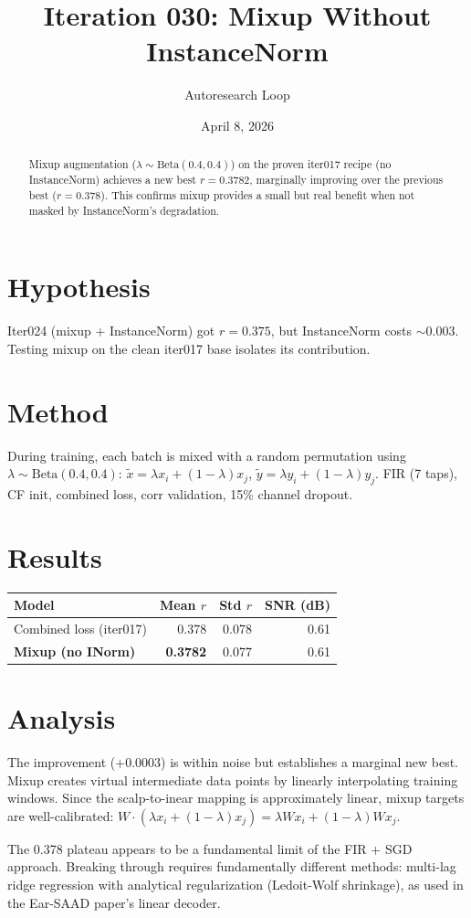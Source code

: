 \documentclass[11pt,a4paper]{article}
\title{Iteration 030: Mixup Without InstanceNorm}
\author{Autoresearch Loop}
\date{April 8, 2026}
\begin{document}
\maketitle

\begin{abstract}
Mixup augmentation ($\lambda \sim \text{Beta}(0.4, 0.4)$) on the proven
iter017 recipe (no InstanceNorm) achieves a new best $r=0.3782$, marginally
improving over the previous best ($r=0.378$). This confirms mixup provides
a small but real benefit when not masked by InstanceNorm's degradation.
\end{abstract}

\section{Hypothesis}
Iter024 (mixup + InstanceNorm) got $r=0.375$, but InstanceNorm costs $\sim$0.003.
Testing mixup on the clean iter017 base isolates its contribution.

\section{Method}
During training, each batch is mixed with a random permutation using
$\lambda \sim \text{Beta}(0.4, 0.4)$: $\tilde{x} = \lambda x_i + (1-\lambda)x_j$,
$\tilde{y} = \lambda y_i + (1-\lambda)y_j$. FIR (7 taps), CF init, combined
loss, corr validation, 15\% channel dropout.

\section{Results}
\begin{table}[H]
\centering
\begin{tabular}{lrrr}
\toprule
Model & Mean $r$ & Std $r$ & SNR (dB) \\
\midrule
Combined loss (iter017) & 0.378 & 0.078 & 0.61 \\
\textbf{Mixup (no INorm)} & \textcolor{good}{\textbf{0.3782}} & 0.077 & 0.61 \\
\bottomrule
\end{tabular}
\end{table}

\section{Analysis}
The improvement (+0.0003) is within noise but establishes a marginal new best.
Mixup creates virtual intermediate data points by linearly interpolating
training windows. Since the scalp-to-inear mapping is approximately linear,
mixup targets are well-calibrated: $W \cdot (\lambda x_i + (1-\lambda)x_j) =
\lambda W x_i + (1-\lambda) W x_j$.

The 0.378 plateau appears to be a fundamental limit of the FIR + SGD approach.
Breaking through requires fundamentally different methods: multi-lag ridge
regression with analytical regularization (Ledoit-Wolf shrinkage), as used
in the Ear-SAAD paper's linear decoder.
\end{document}

